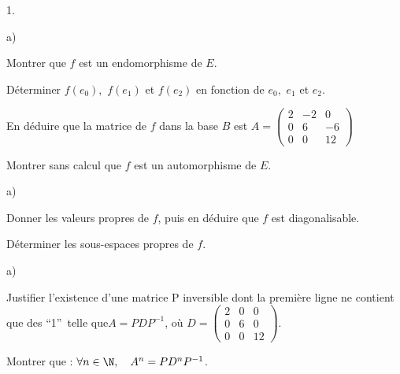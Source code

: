 \documentclass[11pt]{article}%
\begin{document}
\begin{noliste}{1.}
 \setlength{\itemsep}{4mm}
\item 

\begin{noliste}{a)}
 \setlength{\itemsep}{2mm}
\item Montrer que $f$ est un endomorphisme de $E$.

\item Déterminer $f(e_{0}),$ $f(e_{1})$ et $f(e_{2})$ en fonction de
$e_{0},$
$e_{1}$ et $e_{2}$.

\item En déduire que la matrice de $f$ dans la base $B$ est $A = \left(

\begin{array}{ccc}
2 & -2 & 0 \\
0 & 6 & -6 \\
0 & 0 & 12
\end{array}
\right) $

\item Montrer sans calcul que $f$ est un automorphisme de $E$.
\end{noliste}

\item 

\begin{noliste}{a)}
 \setlength{\itemsep}{2mm}
\item Donner les valeurs propres de $f$, puis en déduire que $f$ est
diagonalisable.

\item Déterminer les sous-espaces propres de $f$.
\end{noliste}

\item 

\begin{noliste}{a)}
 \setlength{\itemsep}{2mm}
\item Justifier l'existence d'une matrice P inversible dont la première
ligne ne contient que des \textquotedblleft 1\textquotedblright\ telle
que$
A = PDP^{-1}$, où $D = \left( 
\begin{array}{ccc}
2 & 0 & 0 \\
0 & 6 & 0 \\
0 & 0 & 12
\end{array}
\right).$

\item Montrer que : $\forall n\in \N,\quad A^{n} = PD^{n}P^{-1}$.
\end{noliste}


\end{noliste}
\end{document}
